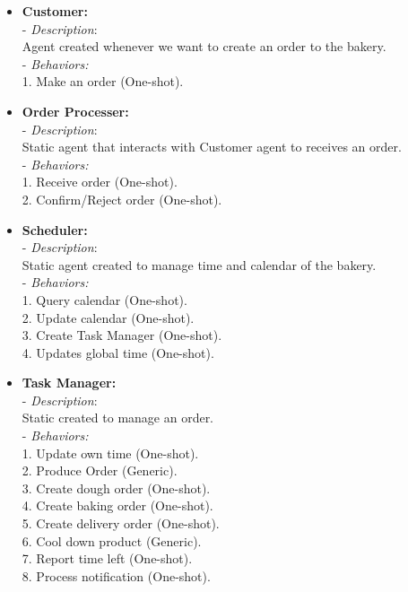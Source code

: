 \documentclass[a4paper]{article}
\begin{document}
	 \begin{itemize}
	 	\item{\textbf{Customer:} \\
	 		- \textit{Description}:\\
	 		Agent created whenever we want to create an order to the bakery. \\
	 		- \textit{Behaviors:} \\
	 		1. Make an order (One-shot).}
	 	
		 \item{\textbf{Order Processer:} \\
		 	- \textit{Description}:\\
		 	Static agent that interacts with Customer agent to receives an order. \\
		 	- \textit{Behaviors:} \\
		 	1. Receive order (One-shot). \\
		 	2. Confirm/Reject order (One-shot).}
		 
		 \item{\textbf{Scheduler:} \\
		 	- \textit{Description}:\\
		 	Static agent created to manage time and calendar of the bakery. \\
		 	- \textit{Behaviors:} \\
		 	1. Query calendar (One-shot).\\
		 	2. Update calendar (One-shot).\\
		 	3. Create Task Manager (One-shot).\\
		 	4. Updates global time (One-shot).}
		 
		 \item{\textbf{Task Manager:} \\
		 	- \textit{Description}:\\
		 	Static created to manage an order. \\
		 	- \textit{Behaviors:} \\
		 	1. Update own time (One-shot).\\
		 	2. Produce Order (Generic).\\
		 	3. Create dough order (One-shot).\\
		 	4. Create baking order (One-shot).\\
		 	5. Create delivery order (One-shot).\\
		 	6. Cool down product (Generic).\\
		 	7. Report time left (One-shot). \\
		 	8. Process notification (One-shot).}
		 

\end{itemize}
\end{document}

